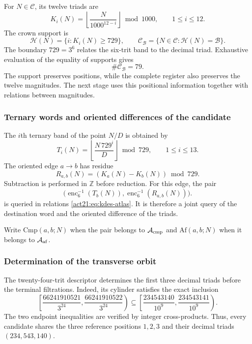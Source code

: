 For $N\in\mathcal C$, its twelve triads are
\begin{equation}
 K_i(N)=\left\lfloor\frac{N}{1000^{12-i}}\right\rfloor\bmod1000,
 \qquad1\leq i\leq12.
 \label{act21:eq:kdes-triadas}
\end{equation}
The crown support is
\[
 \mathcal H(N)=\{i:K_i(N)\geq729\},
 \qquad
 \mathcal C_{\mathcal B}=\{N\in\mathcal C:\mathcal H(N)=\mathcal B\}.
\]
The boundary $729=3^6$ relates the six-trit band to the decimal
triad. Exhaustive evaluation of the equality of supports gives
\begin{equation}
 \#\mathcal C_{\mathcal B}=79.
 \label{act21:eq:kdes-79}
\end{equation}
The support preserves positions, while the complete register
also preserves the twelve magnitudes. The next stage uses this
positional information together with relations between magnitudes.

\subsubsection{Ternary words and oriented differences of the candidate}

The $i$th ternary band of the point $N/D$ is obtained by
\begin{equation}
 T_i(N)=\left\lfloor\frac{N\,729^i}{D}\right\rfloor\bmod729,
 \qquad1\leq i\leq13.
 \label{act21:eq:kdes-tercandidato}
\end{equation}
The oriented edge $a\to b$ has residue
\begin{equation}
 R_{a,b}(N)=(K_a(N)-K_b(N))\bmod729.
 \label{act21:eq:kdes-resarista}
\end{equation}
Subtraction is performed in $\mathbb Z$ before reduction. For this
edge, the pair
\[
 \bigl(\operatorname{enc}_6^{-1}(T_b(N)),
  \operatorname{enc}_6^{-1}(R_{a,b}(N))\bigr).
\]
is queried in relations \eqref{act21:eq:kdes-atlas}. It is therefore a
joint query of the destination word and the oriented difference of the
triads.

Write $\mathrm{Cmp}(a,b;N)$ when the pair belongs to
$\mathcal A_{\rm cmp}$ and $\mathrm{Af}(a,b;N)$ when it belongs to
$\mathcal A_{\rm af}$.

\subsubsection{Determination of the transverse orbit}

The twenty-four-trit descriptor determines the first three
decimal triads before the terminal filtrations. Indeed, its
cylinder satisfies the exact inclusion
\[
 \left[\frac{66241910521}{3^{24}},
       \frac{66241910522}{3^{24}}\right)
 \subseteq
 \left[\frac{234543140}{10^9},
       \frac{234543141}{10^9}\right).
\]
The two endpoint inequalities are verified by integer
cross-products. Thus, every candidate shares the three reference
positions $1,2,3$ and their decimal triads $(234,543,140)$.

